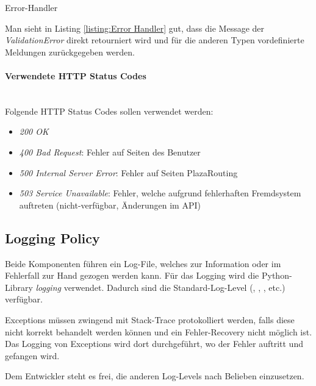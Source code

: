 \begin{listing}[ht]
    \inputminted{python}{projectdoc/listing/flask_error_handler.py}
    \caption{Error-Handler}
    \label{listing:Error Handler}
\end{listing}

Man sieht in Listing \ref{listing:Error Handler} gut, dass die Message der \emph{ValidationError} direkt retourniert wird und für die anderen Typen vordefinierte Meldungen zurückgegeben werden.


\paragraph{Verwendete HTTP Status Codes}\label{ehp:Verwendete HTTP Status Codes}~\\
Folgende HTTP Status Codes sollen verwendet werden:
\begin{itemize}
    \item \emph{200 OK}
    \item \emph{400 Bad Request}: Fehler auf Seiten des Benutzer
    \item \emph{500 Internal Server Error}: Fehler auf Seiten PlazaRouting
    \item \emph{503 Service Unavailable}: Fehler, welche aufgrund fehlerhaften Fremdsystem auftreten (nicht-verfügbar, Änderungen im API)
\end{itemize}


\subsection{Logging Policy}
\label{ehp:Logging Policy}
Beide Komponenten führen ein Log-File, welches zur Information oder im Fehlerfall zur Hand gezogen werden kann. Für das Logging wird die Python-Library \emph{logging} verwendet. Dadurch sind die Standard-Log-Level (, , , etc.) verfügbar.

Exceptions müssen zwingend mit Stack-Trace protokolliert werden, falls diese nicht korrekt behandelt werden können und ein Fehler-Recovery nicht möglich ist. Das Logging von Exceptions wird dort durchgeführt, wo der Fehler auftritt und gefangen wird.

Dem Entwickler steht es frei, die anderen Log-Levels nach Belieben einzusetzen.
